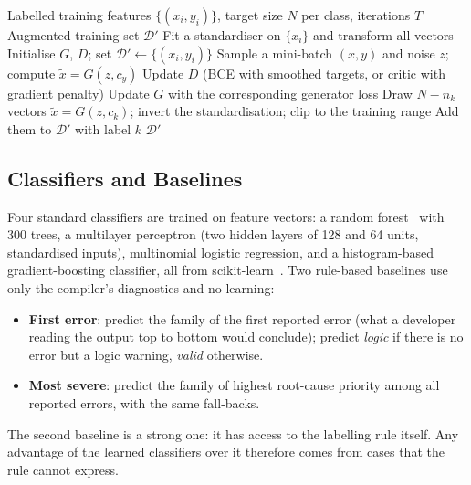 \documentclass[conference]{IEEEtran}
\begin{document}
\begin{algorithm}[t]
\caption{Conditional-GAN augmentation of rare error classes}
\label{alg:aug}
\begin{algorithmic}[1]
\Require Labelled training features $\{(x_i,y_i)\}$, target size $N$ per class, iterations $T$
\Ensure Augmented training set $\mathcal{D}'$
\State Fit a standardiser on $\{x_i\}$ and transform all vectors
\State Initialise $G$, $D$; set $\mathcal{D}'\gets\{(x_i,y_i)\}$
    \State Sample a mini-batch $(x,y)$ and noise $z$; compute $\tilde{x}=G(z,c_y)$
    \State Update $D$ (BCE with smoothed targets, or critic with gradient penalty)
    \State Update $G$ with the corresponding generator loss
\EndFor
{}
    \State Draw $N-n_k$ vectors $\tilde{x}=G(z,c_k)$; invert the standardisation; clip to the training range
    \State Add them to $\mathcal{D}'$ with label $k$
\EndFor
\State \Return $\mathcal{D}'$
\end{algorithmic}
\end{algorithm}

\subsection{Classifiers and Baselines}

Four standard classifiers are trained on feature vectors: a random forest~\cite{breiman2001} with 300 trees, a
multilayer perceptron (two hidden layers of 128 and 64 units, standardised inputs), multinomial logistic regression, and a
histogram-based gradient-boosting classifier, all from scikit-learn~\cite{pedregosa2011}. Two rule-based baselines use
only the compiler's diagnostics and no learning:

\begin{itemize}
    \item \textbf{First error}: predict the family of the first reported error (what a developer reading the output
    top to bottom would conclude); predict \emph{logic} if there is no error but a logic warning, \emph{valid} otherwise.
    \item \textbf{Most severe}: predict the family of highest root-cause priority among all reported errors, with the same
    fall-backs.
\end{itemize}

The second baseline is a strong one: it has access to the labelling rule itself. Any advantage of the learned
classifiers over it therefore comes from cases that the rule cannot express.
\end{document}
